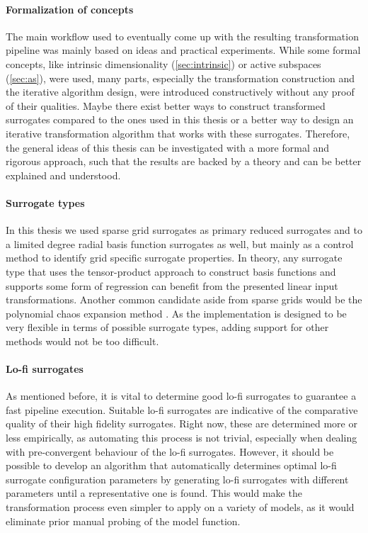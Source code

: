 \documentclass[
  a4paper,  %
  twoside,  %
  bibliography=totoc,
  headsepline,
  cleardoublepage=empty,
  parskip=half,
  draft=false
]{scrbook}
\begin{document}
\paragraph{Formalization of concepts}
The main workflow used to eventually come up with the resulting transformation pipeline was mainly based on ideas and practical experiments.
While some formal concepts, like intrinsic dimensionality (\cref{sec:intrinsic}) or active subspaces (\cref{sec:as}), were used, many parts, especially the transformation construction and the iterative algorithm design, were introduced constructively without any proof of their qualities.
Maybe there exist better ways to construct transformed surrogates compared to the ones used in this thesis or a better way to design an iterative transformation algorithm that works with these surrogates.
Therefore, the general ideas of this thesis can be investigated with a more formal and rigorous approach, such that the results are backed by a theory and can be better explained and understood.

\paragraph{Surrogate types}
In this thesis we used sparse grid surrogates as primary reduced surrogates and to a limited degree radial basis function surrogates as well, but mainly as a control method to identify grid specific surrogate properties.
In theory, any surrogate type that uses the tensor-product approach to construct basis functions and supports some form of regression can benefit from the presented linear input transformations.
Another common candidate aside from sparse grids would be the polynomial chaos expansion method \cite{Crestaux2009}.
As the implementation is designed to be very flexible in terms of possible surrogate types, adding support for other methods would not be too difficult.

\paragraph{Lo-fi surrogates}
As mentioned before, it is vital to determine good lo-fi surrogates to guarantee a fast pipeline execution.
Suitable lo-fi surrogates are indicative of the comparative quality of their high fidelity surrogates.
Right now, these are determined more or less empirically, as automating this process is not trivial, especially when dealing with pre-convergent behaviour of the lo-fi surrogates.
However, it should be possible to develop an algorithm that automatically determines optimal lo-fi surrogate configuration parameters by generating lo-fi surrogates with different parameters until a representative one is found.
This would make the transformation process even simpler to apply on a variety of models, as it would eliminate prior manual probing of the model function.
\end{document}
